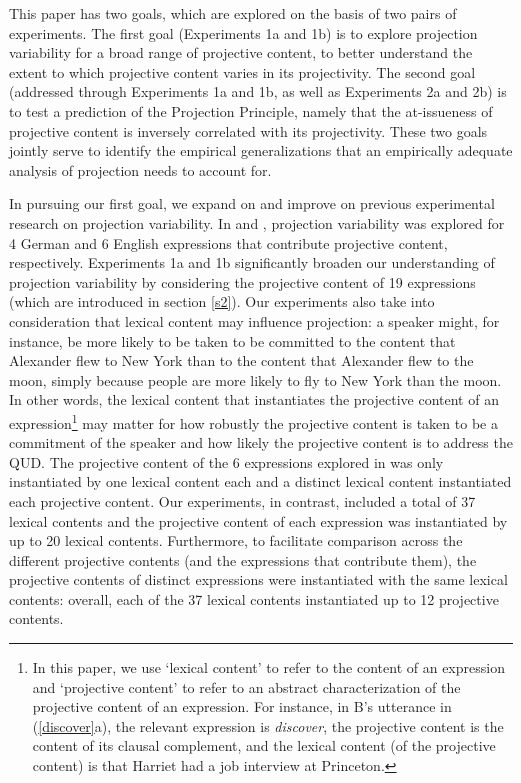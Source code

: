 \documentclass[11pt,fleqn]{article}
\newcommand{\6}{\mbox{$[\hspace*{-.6mm}[$}}
\newcommand{\9}{\mbox{$]\hspace*{-.6mm}]$}}
\begin{document}
This paper has two goals, which are explored on the basis of two pairs of experiments. The first goal (Experiments 1a and 1b) is to explore projection variability for a broad range of projective content, to better understand the extent to which projective content varies in its projectivity. The second goal (addressed through Experiments 1a and 1b, as well as Experiments 2a and 2b) is to test a prediction of the Projection Principle, namely that the at-issueness of projective content is inversely correlated with its projectivity. These two goals jointly serve to identify the empirical generalizations that an empirically adequate analysis of projection needs to account for. 

In pursuing our first goal, we expand on and improve on previous experimental research on projection variability. In \citealt{xue-onea11} and \citealt{smith-hall11}, projection variability was explored for 4 German and 6 English expressions that contribute projective content, respectively. Experiments 1a and 1b significantly broaden our understanding of projection variability by considering the projective content of 19 expressions (which are introduced in section \ref{s2}). Our experiments also take into consideration that lexical content may influence projection: a speaker might, for instance, be more likely to be taken to be committed to the content that Alexander flew to New York than to the content that Alexander flew to the moon, simply because people are more likely to fly to New York than the moon. In other words, the lexical content that instantiates the projective content of an expression\footnote{\label{f-content}In this paper, we use `lexical content' to refer to the content of an expression and `projective content' to refer to an abstract characterization of the projective content of an expression. For instance, in B's utterance in (\ref{discover}a), the relevant expression is {\em discover}, the projective content is the content of its clausal complement, and the lexical content (of the projective content) is that Harriet had a job interview at Princeton.} may matter for how robustly the projective content is taken to be a commitment of the speaker and how likely the projective content is to address the QUD. The projective content of the 6 expressions explored in \citealt{smith-hall11} was only instantiated by one lexical content each and a distinct lexical content instantiated each projective content. Our experiments, in contrast, included a total of 37 lexical contents and the projective content of each expression was instantiated by up to 20 lexical contents. Furthermore, to facilitate comparison across the different projective contents (and the expressions that contribute them), the projective contents of distinct expressions were instantiated with the same lexical contents: overall, each of the 37 lexical contents instantiated up to 12 projective contents.
\end{document}
